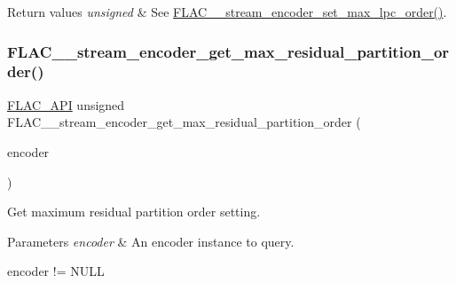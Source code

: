\begin{DoxyRetVals}{Return values}
{\em unsigned} & See \hyperlink{group__flac__stream__encoder_gac3bde5abdaa340674c5659e2e85d2611}{F\+L\+A\+C\+\_\+\+\_\+stream\+\_\+encoder\+\_\+set\+\_\+max\+\_\+lpc\+\_\+order()}. \\
\hline
\end{DoxyRetVals}
\mbox{\label{group__flac__stream__encoder_ga8f96ce37192b7d062394d710fc01b59e}} 
\subsubsection{\texorpdfstring{F\+L\+A\+C\+\_\+\+\_\+stream\+\_\+encoder\+\_\+get\+\_\+max\+\_\+residual\+\_\+partition\+\_\+order()}{FLAC\_\_stream\_encoder\_get\_max\_residual\_partition\_order()}}
{\footnotesize\ttfamily \hyperlink{group__flac__export_ga56ca07df8a23310707732b1c0007d6f5}{F\+L\+A\+C\+\_\+\+A\+PI} unsigned F\+L\+A\+C\+\_\+\+\_\+stream\+\_\+encoder\+\_\+get\+\_\+max\+\_\+residual\+\_\+partition\+\_\+order (\begin{DoxyParamCaption}\item[{\hyperlink{zconf_8h_a2c212835823e3c54a8ab6d95c652660e}{const} \hyperlink{struct_f_l_a_c_____stream_encoder}{F\+L\+A\+C\+\_\+\+\_\+\+Stream\+Encoder} $\ast$}]{encoder }\end{DoxyParamCaption})}

Get maximum residual partition order setting.


\begin{DoxyParams}{Parameters}
{\em encoder} & An encoder instance to query.  
\begin{DoxyCode}
encoder != NULL 
\end{DoxyCode}
 \\
\hline
\end{DoxyParams}

